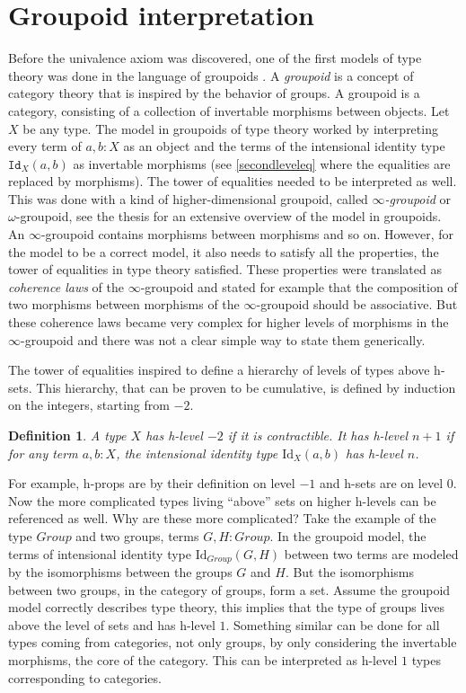 \documentclass[11pt,a4paper,twoside,xetex,draft]{book}
\newcommand{\keyword}[1]{\emph{#1}\index{#1}}
\newtheorem{definition}[theorem]{Definition}
\newcommand{\op}[1]{\mathtt{#1}}
\begin{document}
\section{Groupoid interpretation}\label{groupoidinterp}

Before the univalence axiom was discovered, one of the first models of type theory was done in the language of groupoids \cite{Hofmann1998}. A \keyword{groupoid} is a concept of category theory that is inspired by the behavior of groups. A groupoid is a category, consisting of a collection of invertable morphisms between objects. Let $X$ be any type. The model in groupoids of type theory worked by interpreting every term of $a,b:X$ as an object and the terms of the intensional identity type $\op{Id}_X(a,b)$ as invertable morphisms (see \cref{secondleveleq} where the equalities are replaced by morphisms). The tower of equalities needed to be interpreted as well. This was done with a kind of higher-dimensional groupoid, called \keyword{$\infty$-groupoid} or $\omega$-groupoid, see the thesis \cite{Lumsdaine2010} for an extensive overview of the model in groupoids. An $\infty$-groupoid contains morphisms between morphisms and so on. However, for the model to be a correct model, it also needs to satisfy all the properties, the tower of equalities in type theory satisfied. These properties were translated as \keyword{coherence laws} of the $\infty$-groupoid and stated for example that the composition of two morphisms between morphisms of the $\infty$-groupoid should be associative. But these coherence laws became very complex for higher levels of morphisms in the $\infty$-groupoid and there was not a clear simple way to state them generically.

The tower of equalities inspired \cite{Voevodsky2016} to define a hierarchy of levels of types above h-sets. This hierarchy, that can be proven to be cumulative, is defined by induction on the integers, starting from $-2$. 

\begin{definition}
A type $X$ has \keyword{h-level} $-2$ if it is contractible. It has h-level $n+1$ if for any term $a,b:X$, the intensional identity type $\text{Id}_X(a,b)$ has h-level $n$.
\end{definition}

For example, h-props are by their definition on level $-1$ and h-sets are on level $0$. Now the more complicated types living ``above'' sets on higher h-levels can be referenced as well. Why are these more complicated? Take the example of the type $Group$ and two groups, terms $G,H:Group$. In the groupoid model, the terms of intensional identity type $\text{Id}_{Group}(G,H)$ between two terms are modeled by the isomorphisms between the groups $G$ and $H$. But the isomorphisms between two groups, in the category of groups, form a set. Assume the groupoid model correctly describes type theory, this implies that the type of groups lives above the level of sets and has h-level $1$. Something similar can be done for all types coming from categories, not only groups, by only considering the invertable morphisms, the core of the category. This can be interpreted as h-level $1$ types corresponding to categories.
\end{document}
